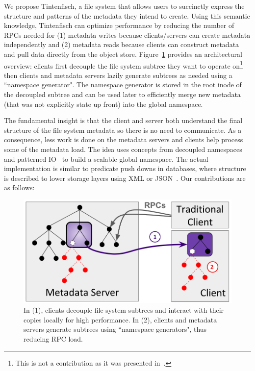 We propose Tintenfisch, a file system that allows users to succinctly express
the structure and patterns of the metadata they intend to create.  Using this
semantic knowledge, Tintenfisch can optimize performance by reducing the number
of RPCs needed for (1) metadata writes because clients/servers can create
metadata independently and (2) metadata reads because clients can construct
metadata and pull data directly from the object store. Figure~\ref{fig:intro}
provides an architectural overview: clients first decouple the file system
subtree they want to operate on\footnote{This is not a contribution as it was
presented in~\cite{sevilla:ipdps18-cudele}.} then clients and metadata servers
lazily generate subtrees as needed using a ``namespace generator". The namespace
generator is stored in the root inode of the decoupled subtree and can be used
later to efficiently merge new metadata (that was not explicitly state up
front) into the global namespace.

The fundamental insight is that the client and server both understand the final
structure of the file system metadata so there is no need to communicate.  As a
consequence, less work is done on the metadata servers and clients help process
some of the metadata load.  The idea uses concepts from decoupled
namespaces~\cite{zheng:pdsw2014-batchfs, zheng:pdsw2015-deltafs} and patterned
IO~\cite{he:hpdc13-plfs-patterns} to build a scalable global namespace. The
actual implementation is similar to predicate push downs in databases, where
structure is described to lower storage layers using XML or
JSON~\cite{shel:pc17-pushdown}. Our contributions are as follows:

\begin{figure}[t]
  \centering
  \includegraphics[width=0.9\linewidth]{figures/intro.png}
  \caption{In (1), clients decouple file system subtrees and interact with
their copies locally for high performance. In (2), clients and metadata servers
generate subtrees using ``namespace generators", thus reducing RPC load.
\label{fig:intro}}
\end{figure}

